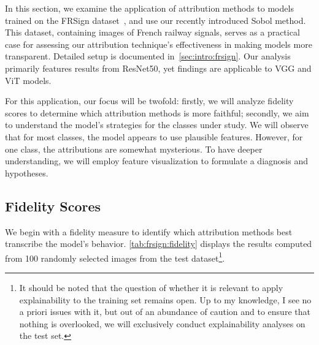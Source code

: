 In this section, we examine the application of attribution methods to models trained on the FRSign dataset~\cite{2020frsign}, and use our recently introduced Sobol method. This dataset, containing images of French railway signals, serves as a practical case for assessing our attribution technique's effectiveness in making models more transparent. Detailed setup is documented in~\autoref{sec:intro:frsign}. Our analysis primarily features results from ResNet50, yet findings are applicable to VGG and ViT models.

For this application, our focus will be twofold: firstly, we will analyze fidelity scores to determine which attribution methods is more faithful; secondly, we aim to understand the model's strategies for the classes under study. We will observe that for most classes, the model appears to use plausible features. However, for one class, the attributions are somewhat mysterious. To have deeper understanding, we will employ feature visualization to formulate a diagnosis and hypotheses.

\subsection{Fidelity Scores}

We begin with a fidelity measure to identify which attribution methods best transcribe the model's behavior. \autoref{tab:frsign:fidelity} displays the results computed from 100 randomly selected images from the test dataset\footnote{It should be noted that the question of whether it is relevant to apply explainability to the training set remains open. Up to my knowledge, I see no a priori issues with it, but out of an abundance of caution and to ensure that nothing is overlooked, we will exclusively conduct explainability analyses on the test set.}.

